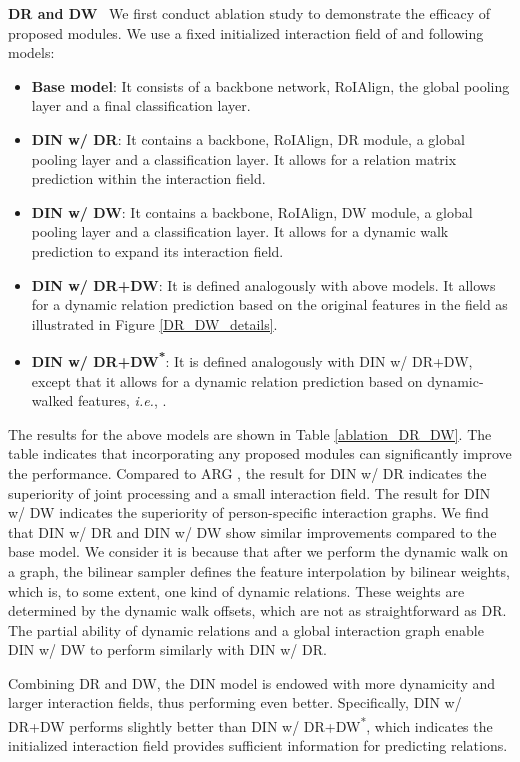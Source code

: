 \documentclass[10pt,twocolumn,letterpaper]{article}
\begin{document}
\textbf{DR and DW} \ We first conduct ablation study to demonstrate the efficacy of proposed modules. We use a fixed initialized interaction field of  and following models: 
\begin{itemize}[noitemsep,topsep=0pt,parsep=0pt,partopsep=0pt]
    \item \textbf{Base model}: It consists of a backbone network, RoIAlign, the global pooling layer and a final classification layer.
\item \textbf{DIN w/ DR}: It contains a backbone, RoIAlign, DR module, a global pooling layer and a classification layer. It allows for a relation matrix prediction within the interaction field.
\item \textbf{DIN w/ DW}: It contains a backbone, RoIAlign, DW module, a global pooling layer and a classification layer. It allows for a dynamic walk prediction to expand its interaction field.
    \item \textbf{DIN w/ DR+DW}: It is defined analogously with above models. It allows for a dynamic relation prediction based on the original features in the field as illustrated in Figure \ref{DR_DW_details}.
    \item \textbf{DIN w/ DR+DW\textsuperscript{*}}: It is defined analogously with DIN w/ DR+DW, except that it allows for a dynamic relation prediction based on dynamic-walked features, \textit{i.e.}, .
    
\end{itemize}
The results for the above models are shown in Table \ref{ablation_DR_DW}. The table indicates that incorporating any proposed modules can significantly improve the performance. Compared to ARG \cite{wu2019learning}, the result for DIN w/ DR indicates the superiority of joint processing and a small interaction field. The result for DIN w/ DW indicates the superiority of person-specific interaction graphs. We find that DIN w/ DR and DIN w/ DW show similar improvements compared to the base model. We consider it is because that after we perform the dynamic walk on a graph, the bilinear sampler defines the feature interpolation by bilinear weights, which is, to some extent, one kind of dynamic relations. These weights are determined by the dynamic walk offsets, which are not as straightforward as DR. The partial ability of dynamic relations and a global interaction graph enable DIN w/ DW to perform similarly with DIN w/ DR.

Combining DR and DW, the DIN model is endowed with more dynamicity and larger interaction fields, thus performing even better. Specifically, DIN w/ DR+DW performs slightly better than DIN w/ DR+DW\textsuperscript{*}, which indicates the initialized interaction field provides sufficient information for predicting relations. 
\end{document}
